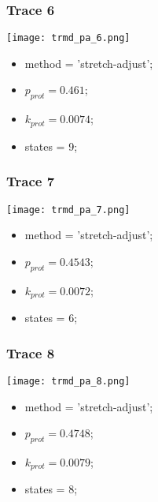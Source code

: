 \subsubsection{Trace 6}
\begin{minipage}[c]{0.7\textwidth}
    \texttt{[image: trmd\_pa\_6.png]}
\end{minipage}
\hfill
\begin{minipage}[c]{0.45\textwidth}
    \begin{itemize}
        \item method = 'stretch-adjust';
        \item $p_{prot}=0.461$;
        \item $k_{prot}=0.0074$;
        \item states = 9;
    \end{itemize}
\end{minipage}

\subsubsection{Trace 7}
\begin{minipage}[c]{0.7\textwidth}
    \texttt{[image: trmd\_pa\_7.png]}
\end{minipage}
\hfill
\begin{minipage}[c]{0.45\textwidth}
    \begin{itemize}
        \item method = 'stretch-adjust';
        \item $p_{prot}=0.4543$;
        \item $k_{prot}=0.0072$;
        \item states = 6;
    \end{itemize}
\end{minipage}

\subsubsection{Trace 8}
\begin{minipage}[c]{0.7\textwidth}
    \texttt{[image: trmd\_pa\_8.png]}
\end{minipage}
\hfill
\begin{minipage}[c]{0.45\textwidth}
    \begin{itemize}
        \item method = 'stretch-adjust';
        \item $p_{prot}=0.4748$;
        \item $k_{prot}=0.0079$;
        \item states = 8;
    \end{itemize}
\end{minipage}

